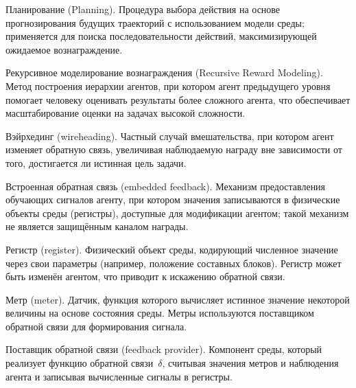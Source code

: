 \begin{definition}
    \label{def:planning}
    Планирование (Planning). Процедура выбора действия на основе прогнозирования будущих траекторий с использованием модели среды; применяется для поиска последовательности действий, максимизирующей ожидаемое вознаграждение.
\end{definition}

\begin{definition}
    \label{def:rrm}
    Рекурсивное моделирование вознаграждения (Recursive Reward Modeling). Метод построения иерархии агентов, при котором агент предыдущего уровня помогает человеку оценивать результаты более сложного агента, что обеспечивает масштабирование оценки на задачах высокой сложности.
\end{definition}


\begin{definition}
    \label{def:wireheading}
    Вэйрхединг (wireheading). Частный случай вмешательства, при котором 
    агент изменяет обратную связь, увеличивая наблюдаемую награду вне зависимости 
    от того, достигается ли истинная цель задачи.
\end{definition}

\begin{definition}
    \label{def:embedded_feedback}
    Встроенная обратная связь (embedded feedback). Механизм предоставления 
    обучающих сигналов агенту, при котором значения записываются в физические 
    объекты среды (регистры), доступные для модификации агентом; такой механизм 
    не является защищённым каналом награды.
\end{definition}

\begin{definition}
    \label{def:register}
    Регистр (register). Физический объект среды, кодирующий численное 
    значение через свои параметры (например, положение составных блоков). 
    Регистр может быть изменён агентом, что приводит к искажению обратной связи.
\end{definition}

\begin{definition}
    \label{def:meter}
    Метр (meter). Датчик, функция которого вычисляет истинное значение 
    некоторой величины на основе состояния среды. Метры используются 
    поставщиком обратной связи для формирования сигнала.
\end{definition}

\begin{definition}
    \label{def:feedback_provider}
    Поставщик обратной связи (feedback provider). Компонент среды, который 
    реализует функцию обратной связи~$\delta$, считывая значения метров и 
    наблюдения агента и записывая вычисленные сигналы в регистры.
\end{definition}

